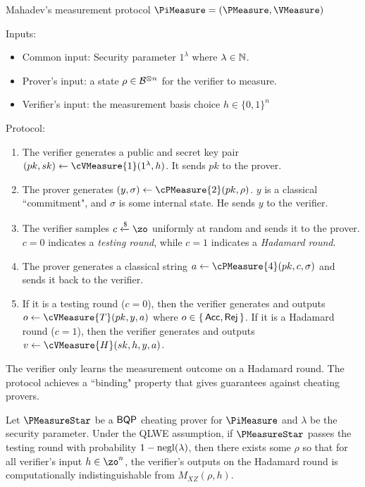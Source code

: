 \begin{protocol}{Mahadev's measurement protocol $\PiMeasure=(\PMeasure, \VMeasure)$}
	\label{proto:urmila4}

	Inputs:
	\begin{itemize}
		\item Common input: Security parameter $1^\lambda$ where $\lambda\in\bbN$.
		\item Prover's input: a state $\rho\in\mathcal{B}^{\otimes n}$ for the verifier to measure.
		\item Verifier's input:
			the measurement basis choice $h \in \{0,1\}^n$
	\end{itemize}

	Protocol:
	\begin{enumerate}
		\item \label{step:measure1} The verifier generates a public and secret key pair $(pk, sk)\leftarrow\cVMeasure{1}(1^\lambda, h)$. It sends $pk$ to the prover.
		\item \label{step:measure2} The prover generates $(y, \sigma)\leftarrow\cPMeasure{2}(pk, \rho)$.
			$y$ is a classical ``commitment", and $\sigma$ is some internal state.
			He sends $y$ to the verifier.
		\item \label{step:measure3} The verifier samples $c\xleftarrow{\$}\zo$ uniformly at random and sends it to the prover. $c=0$ indicates a \emph{testing round}, while $c=1$ indicates a \emph{Hadamard round}.
		\item \label{step:measure4} The prover generates a classical string $a\leftarrow\cPMeasure{4}(pk, c, \sigma)$ and sends it back to the verifier.
		\item \label{step:output} If it is a testing round ($c=0$), then the verifier generates and outputs $o\leftarrow\cVMeasure{T}(pk, y, a)$ where $o\in\set{\mathsf{Acc}, \mathsf{Rej}}$.
			If it is a Hadamard round ($c=1$), then the verifier generates and outputs $v\leftarrow\cVMeasure{H}(sk, h, y, a)$.
	\end{enumerate}
\end{protocol}

The verifier only learns the measurement outcome on a Hadamard round.
The protocol achieves a ``binding" property that gives guarantees against cheating provers.

\begin{lemma}
	\label{lem:urmila-binding}
	Let $\PMeasureStar$ be a $\operatorname{\mathsf{BQP}}$ cheating  prover for $\PiMeasure$ and $\lambda$ be the security parameter. Under the QLWE assumption, if $\PMeasureStar$ passes the testing round with probability $1-\negl(\lambda)$, then there exists some $\rho$ so that for all verifier's input $h \in \zo^n$, the verifier's outputs on the Hadamard round is computationally indistinguishable from $M_{XZ}(\rho, h)$.
	\iffalse    
	Suppose that for all $\lambda\in\bbN$ and $h\in\zo^*$ \Ethan{or $\zo^n$?},
	$\PMeasureStar$ passes the testing round with probability $1-\negl(\lambda)$.
	Then, under the QLWE assumption, there exists some $\rho$ so that for all $h$,
	The verifier's output on the Hadamard round is $\negl(\lambda)$-computationally indistinguishable from $M_{XZ}(\rho, h)$.
	\fi
\end{lemma}

